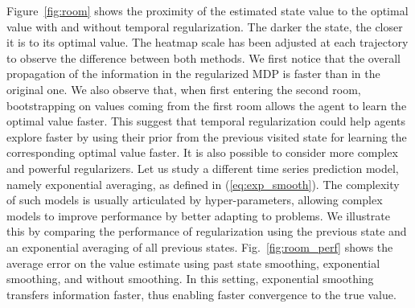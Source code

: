 Figure~\ref{fig:room} shows the proximity of the estimated state value to the optimal value with and without temporal regularization. The darker the state, the closer it is to its optimal value. The heatmap scale has been adjusted at each trajectory to observe the difference between both methods.
We first notice that the overall propagation of the information in the regularized MDP is faster than in the original one. We also observe that, when first entering the second room, bootstrapping on values coming from the first room allows the agent to learn the optimal value faster. This suggest that temporal regularization could help agents explore faster by using their prior from the previous visited state for learning the corresponding optimal value faster. It is also possible to consider more complex and powerful regularizers. Let us study a different time series prediction model, namely exponential averaging, as defined in (\ref{eq:exp_smooth}). The complexity of such models is usually articulated by hyper-parameters, allowing complex models to improve performance by better adapting to problems. We illustrate this by comparing the performance of regularization using the previous state and an exponential averaging of all previous states. Fig.~\ref{fig:room_perf} shows the average error on the value estimate using past state smoothing, exponential smoothing, and without smoothing. In this setting, exponential smoothing transfers information faster, thus enabling faster convergence to the true value.

